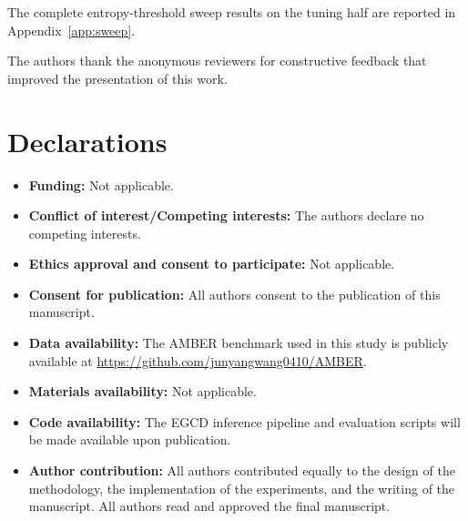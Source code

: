 \documentclass[pdflatex,sn-basic,Numbered]{sn-jnl}
\theoremstyle{thmstyleone}
\theoremstyle{thmstyletwo}
\theoremstyle{thmstylethree}
\begin{document}
\backmatter


The complete entropy-threshold sweep results on the tuning half are reported in Appendix~\ref{app:sweep}.


The authors thank the anonymous reviewers for constructive feedback that improved the presentation of this work.

\section*{Declarations}

\begin{itemize}
\item \textbf{Funding:} Not applicable.
\item \textbf{Conflict of interest/Competing interests:} The authors declare no competing interests.
\item \textbf{Ethics approval and consent to participate:} Not applicable.
\item \textbf{Consent for publication:} All authors consent to the publication of this manuscript.
\item \textbf{Data availability:} The AMBER benchmark used in this study is publicly available at \url{https://github.com/junyangwang0410/AMBER}.
\item \textbf{Materials availability:} Not applicable.
\item \textbf{Code availability:} The EGCD inference pipeline and evaluation scripts will be made available upon publication.
\item \textbf{Author contribution:} All authors contributed equally to the design of the methodology, the implementation of the experiments, and the writing of the manuscript. All authors read and approved the final manuscript.
\end{itemize}
\end{document}
